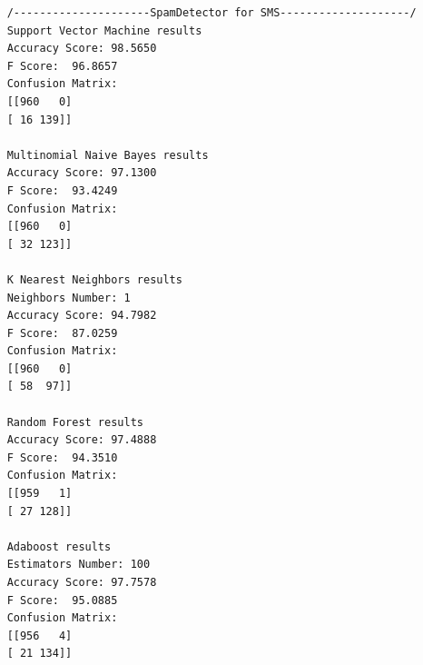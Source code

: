 \documentclass[a4paper]{report}
\begin{document}
\begin{lstlisting}
	/---------------------SpamDetector for SMS--------------------/
	Support Vector Machine results
	Accuracy Score: 98.5650
	F Score:  96.8657
	Confusion Matrix:
	[[960   0]
	[ 16 139]]
	
	Multinomial Naive Bayes results
	Accuracy Score: 97.1300
	F Score:  93.4249
	Confusion Matrix:
	[[960   0]
	[ 32 123]]
	
	K Nearest Neighbors results
	Neighbors Number: 1
	Accuracy Score: 94.7982
	F Score:  87.0259
	Confusion Matrix:
	[[960   0]
	[ 58  97]]
	
	Random Forest results
	Accuracy Score: 97.4888
	F Score:  94.3510
	Confusion Matrix:
	[[959   1]
	[ 27 128]]
	
	Adaboost results
	Estimators Number: 100
	Accuracy Score: 97.7578
	F Score:  95.0885
	Confusion Matrix:
	[[956   4]
	[ 21 134]]
\end{lstlisting}
\end{document}

